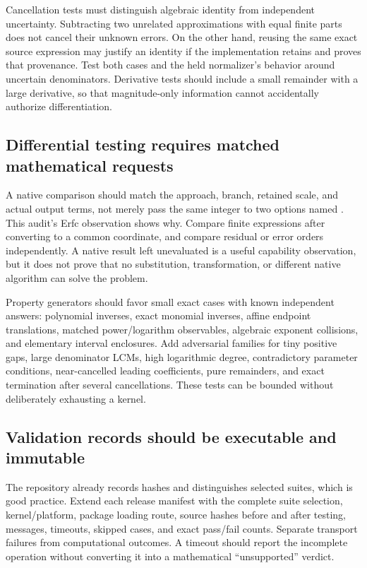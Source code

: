 \documentclass[11pt,a4paper]{article}
\newcommand{\code}[1]{\texttt{\detokenize{#1}}}
\begin{document}
Cancellation tests must distinguish algebraic identity from independent uncertainty. Subtracting two unrelated approximations with equal finite parts does not cancel their unknown errors. On the other hand, reusing the same exact source expression may justify an identity if the implementation retains and proves that provenance. Test both cases and the held normalizer's behavior around uncertain denominators. Derivative tests should include a small remainder with a large derivative, so that magnitude-only information cannot accidentally authorize differentiation.

\subsection{Differential testing requires matched mathematical requests}
A native comparison should match the approach, branch, retained scale, and actual output terms, not merely pass the same integer to two options named \code{SeriesTermGoal}. This audit's Erfc observation shows why. Compare finite expressions after converting to a common coordinate, and compare residual or error orders independently. A native result left unevaluated is a useful capability observation, but it does not prove that no substitution, transformation, or different native algorithm can solve the problem.\cite{wl-asymptotic,wl-solve}

Property generators should favor small exact cases with known independent answers: polynomial inverses, exact monomial inverses, affine endpoint translations, matched power/logarithm observables, algebraic exponent collisions, and elementary interval enclosures. Add adversarial families for tiny positive gaps, large denominator LCMs, high logarithmic degree, contradictory parameter conditions, near-cancelled leading coefficients, pure remainders, and exact termination after several cancellations. These tests can be bounded without deliberately exhausting a kernel.

\subsection{Validation records should be executable and immutable}
The repository already records hashes and distinguishes selected suites, which is good practice. Extend each release manifest with the complete suite selection, kernel/platform, package loading route, source hashes before and after testing, messages, timeouts, skipped cases, and exact pass/fail counts. Separate transport failures from computational outcomes. A timeout should report the incomplete operation without converting it into a mathematical ``unsupported'' verdict.\cite{repo-validation}
\end{document}
